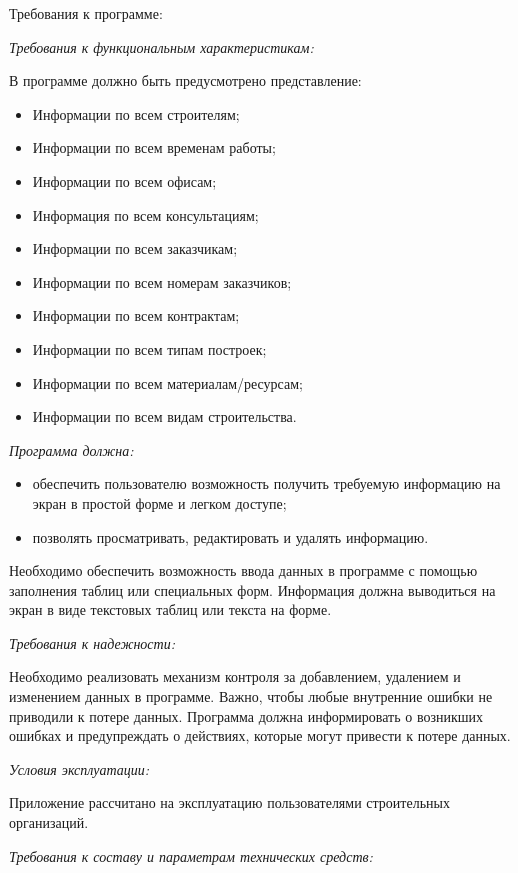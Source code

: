 \documentclass{../SIBGU-state}
\begin{document}
Требования к программе:\par
\textit{Требования к функциональным характеристикам:}\par
В программе должно быть предусмотрено представление:\par
\begin{itemize}
	\item Информации по всем строителям;
	\item Информации по всем временам работы;
    \item Информации по всем офисам;
    \item Информация по всем консультациям;
    \item Информации по всем заказчикам;
    \item Информации по всем номерам заказчиков;
    \item Информации по всем контрактам;
    \item Информации по всем типам построек;
    \item Информации по всем материалам/ресурсам;
    \item Информации по всем видам строительства.
\end{itemize}\par
\textit{Программа должна:}\par
\begin{itemize}
	\item обеспечить пользователю возможность получить требуемую информацию на экран в простой форме и легком доступе;
	\item позволять просматривать, редактировать и удалять информацию.
\end{itemize}\par
Необходимо обеспечить возможность ввода данных в программе с помощью заполнения таблиц или специальных форм. Информация должна выводиться на экран в виде текстовых таблиц или текста на форме.\par
\textit{Требования к надежности:}\par
Необходимо реализовать механизм контроля за добавлением, удалением и изменением данных в программе. Важно, чтобы любые внутренние ошибки не приводили к потере данных. Программа должна информировать о возникших ошибках и предупреждать о действиях, которые могут привести к потере данных.\par
\textit{Условия эксплуатации:}\par
Приложение рассчитано на эксплуатацию пользователями строительных организаций.\par
\textit{Требования к составу и параметрам технических средств:}\par
\end{document}
